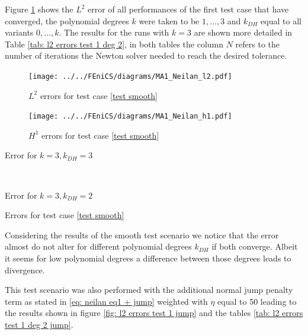 Figure \ref{fig: l2 errors test 1} shows the $L^2$ error of all performances of the first test case that have converged, the polynomial degrees $k$ were taken to be $1,\dots,3$ and $k_{DH}$ equal to all variants $0, \dots, k$.  The results for the runs with $k=3$ are shown more detailed in Table \ref{tab: l2 errors test 1 deg 2}, in both tables the column $N$ refers to the number of iterations the Newton solver needed to reach the desired tolerance. 

%

\begin{figure}[h!]
\centering
	\texttt{[image: ../../FEniCS/diagrams/MA1\_Neilan\_l2.pdf]}
	\caption{$L^2$ errors for test case \ref{test smooth}}
	\label{fig: l2 errors test 1}
\end{figure}

\begin{figure}[h!]
\centering
	\texttt{[image: ../../FEniCS/diagrams/MA1\_Neilan\_h1.pdf]}
	\caption{$H^1$ errors for test case \ref{test smooth}}
	\label{fig: h2 errors test 1}
\end{figure}

\begin{table}[h]
	\begin{subtable}[b]{0.45\textwidth}
		\centering
    	\caption{Error for $k=3, k_{DH}=3$}
   \end{subtable}
   ~
	\begin{subtable}[b]{0.45\textwidth}
		\centering
 	\caption{Error for $k=3, k_{DH}=2$}
	\end{subtable}
	\caption{Errors for test case \ref{test smooth}}
	\label{tab: l2 errors test 1 deg 2}
\end{table}


Considering the results of the smooth test scenario we notice that the error almost do not alter for different polynomial degrees $k_{DH}$ if both converge. Albeit it seems for low polynomial degrees a difference between those degrees leads to divergence.

This test scenario was also performed with the additional normal jump penalty term as stated in \eqref{eq: neilan eq1 + jump} weighted with $\eta$ equal to 50 leading to the results shown in figure \ref{fig: l2 errors test 1 jump} and the tables \ref{tab: l2 errors test 1 deg 2 jump}.


